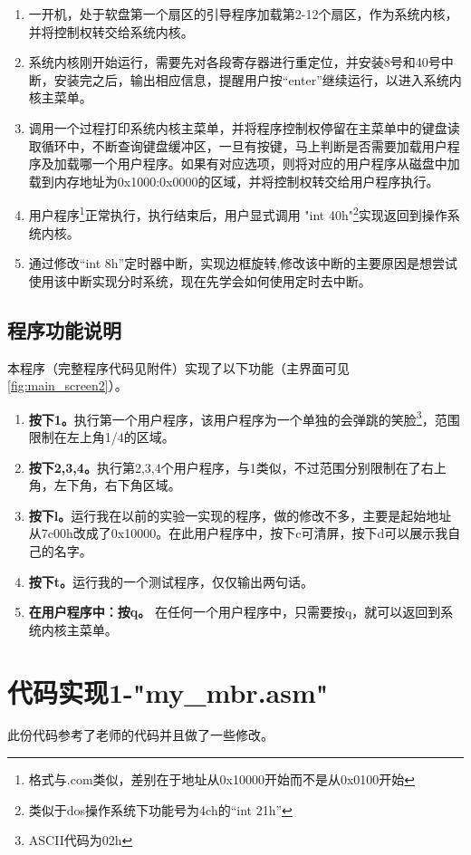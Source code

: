\documentclass[forprint]{WHUBachelor}
\begin{document}
\begin{enumerate}
  \item 一开机，处于软盘第一个扇区的引导程序加载第2-12个扇区，作为系统内核，并将控制权转交给系统内核。
  \item 系统内核刚开始运行，需要先对各段寄存器进行重定位，并安装8号和40号中断，安装完之后，输出相应信息，提醒用户按“enter”继续运行，以进入系统内核主菜单。
  \item 调用一个过程打印系统内核主菜单，并将程序控制权停留在主菜单中的键盘读取循环中，不断查询键盘缓冲区，一旦有按键，马上判断是否需要加载用户程序及加载哪一个用户程序。如果有对应选项，则将对应的用户程序从磁盘中加载到内存地址为0x1000:0x0000的区域，并将控制权转交给用户程序执行。
  \item 用户程序\footnote{格式与.com类似，差别在于地址从0x10000开始而不是从0x0100开始}正常执行，执行结束后，用户显式调用 "int 40h"\footnote{类似于dos操作系统下功能号为4ch的“int 21h”}实现返回到操作系统内核。
  \item 通过修改“int 8h”定时器中断，实现边框旋转,修改该中断的主要原因是想尝试使用该中断实现分时系统，现在先学会如何使用定时去中断。
\end{enumerate}

\subsection{程序功能说明}
本程序（完整程序代码见附件）实现了以下功能（主界面可见\autoref{fig:main_screen2}）。
\begin{enumerate}
  \item \textbf{按下1。}执行第一个用户程序，该用户程序为一个单独的会弹跳的笑脸\footnote{ASCII代码为02h}，范围限制在左上角1/4的区域。
  \item \textbf{按下2,3,4。}执行第2,3,4个用户程序，与1类似，不过范围分别限制在了右上角，左下角，右下角区域。
  \item \textbf{按下l。}运行我在以前的实验一实现的程序，做的修改不多，主要是起始地址从7c00h改成了0x10000。在此用户程序中，按下c可清屏，按下d可以展示我自己的名字。
  \item \textbf{按下t。}运行我的一个测试程序，仅仅输出两句话。
  \item \textbf{在用户程序中：按q。} 在任何一个用户程序中，只需要按q，就可以返回到系统内核主菜单。
\end{enumerate}

\section{代码实现1-"my\_mbr.asm"}
此份代码参考了老师的代码并且做了一些修改。
\end{document}
